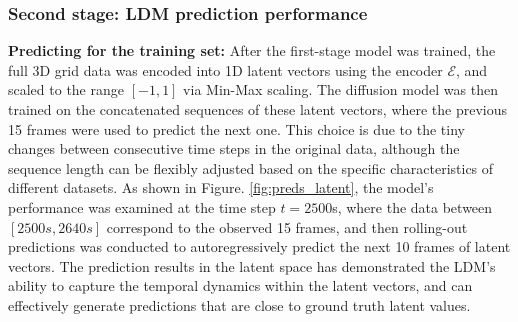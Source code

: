 \documentclass[final-report]{article-template}
\begin{document}
\subsubsection{Second stage: LDM prediction performance}
\textbf{Predicting for the training set:} After the first-stage model was trained, the full 3D grid data was encoded into 1D latent vectors using the encoder $\mathcal{E}$, and scaled to the range $[-1, 1]$ via Min-Max scaling. The diffusion model was then trained on the concatenated sequences of these latent vectors, where the previous 15 frames were used to predict the next one. This choice is due to the tiny changes between consecutive time steps in the original data, although the sequence length can be flexibly adjusted based on the specific characteristics of different datasets. As shown in Figure. \ref{fig:preds_latent}, the model's performance was examined at the time step $t = 2500$s, where the data between $[2500s, 2640s]$ correspond to the observed 15 frames, and then rolling-out predictions was conducted to autoregressively predict the next 10 frames of latent vectors. The prediction results in the latent space has demonstrated the LDM's ability to capture the temporal dynamics within the latent vectors, and can effectively generate predictions that are close to ground truth latent values.
\end{document}
